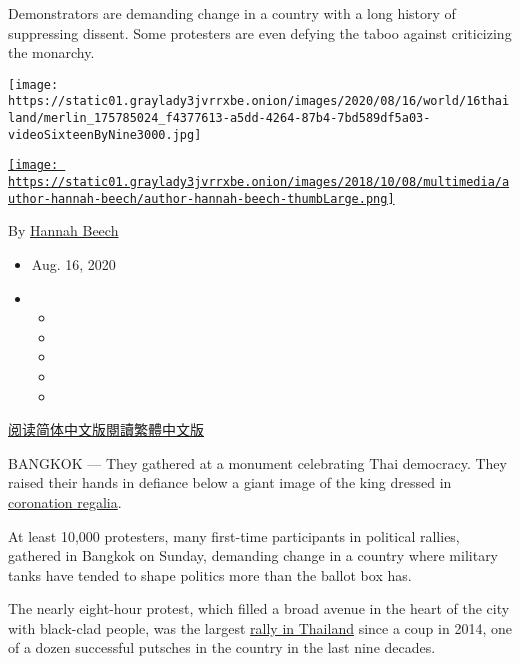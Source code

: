 Demonstrators are demanding change in a country with a long history of
suppressing dissent. Some protesters are even defying the taboo against
criticizing the monarchy.

\texttt{[image: https://static01.graylady3jvrrxbe.onion/images/2020/08/16/world/16thailand/merlin\_175785024\_f4377613-a5dd-4264-87b4-7bd589df5a03-videoSixteenByNine3000.jpg]}

\href{https://www.nytimes3xbfgragh.onion/by/hannah-beech}{\texttt{[image: https://static01.graylady3jvrrxbe.onion/images/2018/10/08/multimedia/author-hannah-beech/author-hannah-beech-thumbLarge.png]}}

By \href{https://www.nytimes3xbfgragh.onion/by/hannah-beech}{Hannah
Beech}

\begin{itemize}
\item
  Aug. 16, 2020
\item
  \begin{itemize}
  \item
  \item
  \item
  \item
  \item
  \end{itemize}
\end{itemize}

\href{https://cn.nytimes3xbfgragh.onion/asia-pacific/20200817/thailand-protests-democracy-monarchy/}{阅读简体中文版}\href{https://cn.nytimes3xbfgragh.onion/asia-pacific/20200817/thailand-protests-democracy-monarchy/zh-hant/}{閱讀繁體中文版}

BANGKOK --- They gathered at a monument celebrating Thai democracy. They
raised their hands in defiance below a giant image of the king dressed
in
\href{https://www.nytimes3xbfgragh.onion/2019/05/04/world/asia/thailand-king-maha-vajiralongkorn.html?action=click\&module=RelatedLinks\&pgtype=Article}{coronation
regalia}.

At least 10,000 protesters, many first-time participants in political
rallies, gathered in Bangkok on Sunday, demanding change in a country
where military tanks have tended to shape politics more than the ballot
box has.

The nearly eight-hour protest, which filled a broad avenue in the heart
of the city with black-clad people, was the largest
\href{https://www.nytimes3xbfgragh.onion/2020/08/20/world/asia/thailand-arrests-protests.html}{rally
in Thailand} since a coup in 2014, one of a dozen successful putsches in
the country in the last nine decades.

